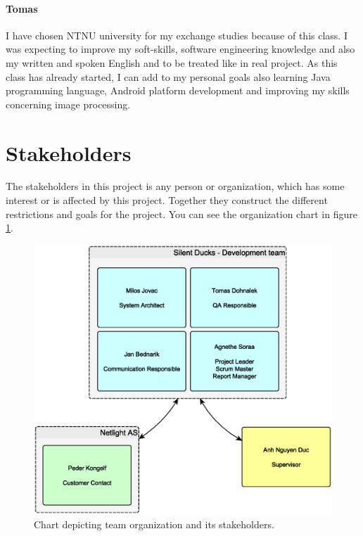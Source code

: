 \paragraph{Tomas}
I have chosen NTNU university for my exchange studies because of this class. 
I was expecting to improve my soft-skills, software engineering knowledge and also my written and spoken English and to be treated like in real project.
As this class has already started, I can add to my personal goals also learning Java programming language,
Android platform development and improving my skills concerning image processing.

\section{Stakeholders}

The stakeholders in this project is any person or organization, which has some interest or is affected by this project. Together they construct the different restrictions and goals for the project. 
You can see the organization chart in figure \ref{img:organization_chart}.

\begin{figure}[!ht]
    \begin{center}
    \includegraphics[width=12cm]{images/organization_chart.eps}
    \caption{Chart depicting team organization and its stakeholders.}
    \label{img:organization_chart}
    \end{center}
\end{figure}


